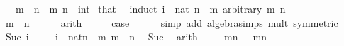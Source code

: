 \begin{isabellebody}
\ \ \ {\isachardoublequoteopen}m\ {\isasymle}\ n{\isachardoublequoteclose}\ \ m\ n\ {\isacharcolon}{\kern0pt}{\isacharcolon}{\kern0pt}\ int\isanewline
%
\isadelimproof
%
\endisadelimproof
%
\isatagproof
{}\isamarkupfalse%
\ that\ \isamarkupfalse%
\ {\isacharparenleft}{\kern0pt}induct\ i\ {\isasymequiv}\ {\isachardoublequoteopen}nat\ {\isacharparenleft}{\kern0pt}n\ {\isacharminus}{\kern0pt}\ m{\isacharparenright}{\kern0pt}{\isachardoublequoteclose}\ arbitrary{\isacharcolon}{\kern0pt}\ m\ n{\isacharparenright}{\kern0pt}\isanewline
\ \ \isamarkupfalse%
\ {}\isanewline
\ \ \isamarkupfalse%
\ \isamarkupfalse%
\ {\isachardoublequoteopen}m\ {\isacharequal}{\kern0pt}\ n{\isachardoublequoteclose}\isanewline
\ \ \ \ \isamarkupfalse%
\ arith\isanewline
\ \ \isamarkupfalse%
\ \isamarkupfalse%
\ {\isacharquery}{\kern0pt}case\isanewline
\ \ \ \ \isamarkupfalse%
\ {\isacharparenleft}{\kern0pt}simp\ add{\isacharcolon}{\kern0pt}\ algebra{\isacharunderscore}{\kern0pt}simps\ mult{\isacharunderscore}{\kern0pt}{}\ {\isacharbrackleft}{\kern0pt}symmetric{\isacharbrackright}{\kern0pt}{\isacharparenright}{\kern0pt}\isanewline
{}\isamarkupfalse%
\isanewline
\ \ \isamarkupfalse%
\ {\isacharparenleft}{\kern0pt}Suc\ i{\isacharparenright}{\kern0pt}\isanewline
\ \ \isamarkupfalse%
\ {}{\isacharcolon}{\kern0pt}\ {\isachardoublequoteopen}i\ {\isacharequal}{\kern0pt}\ nat{\isacharparenleft}{\kern0pt}{\isacharparenleft}{\kern0pt}n{\isacharminus}{\kern0pt}{}{\isacharparenright}{\kern0pt}\ {\isacharminus}{\kern0pt}\ m{\isacharparenright}{\kern0pt}{\isachardoublequoteclose}\ {\isachardoublequoteopen}m\ {\isasymle}\ n{\isacharminus}{\kern0pt}{}{\isachardoublequoteclose}\ \isamarkupfalse%
\ Suc{\isacharparenleft}{\kern0pt}{}{\isacharcomma}{\kern0pt}{}{\isacharparenright}{\kern0pt}\ \isamarkupfalse%
\ arith{\isacharplus}{\kern0pt}\isanewline
\ \ \isamarkupfalse%
\ {\isachardoublequoteopen}{\isasymSum}\ {\isacharbraceleft}{\kern0pt}m{\isachardot}{\kern0pt}{\isachardot}{\kern0pt}n{\isacharbraceright}{\kern0pt}\ {\isacharequal}{\kern0pt}\ {\isasymSum}\ {\isacharbraceleft}{\kern0pt}m{\isachardot}{\kern0pt}{\isachardot}{\kern0pt}{}{\isacharplus}{\kern0pt}{\isacharparenleft}{\kern0pt}n{\isacharminus}{\kern0pt}{}{\isacharparenright}{\kern0pt}{\isacharbraceright}{\kern0pt}{\isachardoublequoteclose}\ \isamarkupfalse%

\end{isabellebody}
